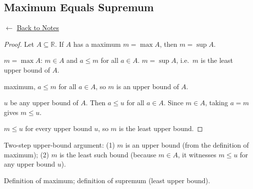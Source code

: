 
\subsection*{Maximum Equals Supremum}
\label{prf:max-is-sup}

\begin{remark*}[Return]
$\leftarrow$ \hyperref[prop:sup-unique]{Back to Notes}
\end{remark*}

\begin{proof}
\Claim Let $A \subseteq \mathbb{R}$.
If $A$ has a maximum $m = \max A$, then $m = \sup A$.

\Given $m = \max A$: $m \in A$ and $a \le m$ for all $a \in A$.
\Goal $m = \sup A$, i.e.\ $m$ is the least upper bound of $A$.

\ByDef maximum, $a \le m$ for all $a \in A$, so $m$ is an upper bound of $A$.

\Let $u$ be any upper bound of $A$.
Then $a \le u$ for all $a \in A$.
Since $m \in A$, taking $a = m$ gives $m \le u$.

\Therefore $m \le u$ for every upper bound $u$, so $m$ is the least upper bound. \AsReq
\end{proof}

\begin{remark*}
Two-step upper-bound argument: (1) $m$ is an upper bound (from the definition
of maximum); (2) $m$ is the least such bound (because $m \in A$, it witnesses
$m \le u$ for any upper bound $u$).
\end{remark*}

\begin{remark*}[Dependencies]
Definition of maximum; definition of supremum (least upper bound).
\end{remark*}

